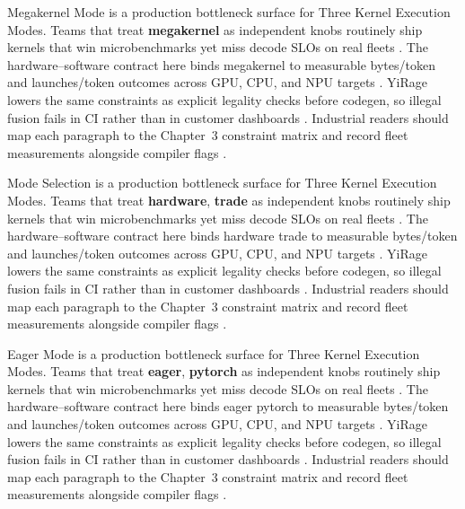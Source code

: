 Megakernel Mode is a production bottleneck surface for Three Kernel Execution Modes. Teams that treat \textbf{megakernel} as independent knobs routinely ship kernels that win microbenchmarks yet miss decode SLOs on real fleets \citep{amd2024aie,kwon2023vllm}. The hardware--software contract here binds megakernel to measurable bytes/token and launches/token outcomes across GPU, CPU, and NPU targets \citep{dlbook,nvidia2024cudagraphs}. YiRage lowers the same constraints as explicit legality checks before codegen, so illegal fusion fails in CI rather than in customer dashboards \citep{dao2022flashattention,liu2024deepseekv3}. Industrial readers should map each paragraph to the Chapter~3 constraint matrix and record fleet measurements alongside compiler flags \citep{kwon2023vllm,patel2025llminference}.

Mode Selection is a production bottleneck surface for Three Kernel Execution Modes. Teams that treat \textbf{hardware}, \textbf{trade} as independent knobs routinely ship kernels that win microbenchmarks yet miss decode SLOs on real fleets \citep{dlbook,nvidia2024cudagraphs}. The hardware--software contract here binds hardware trade to measurable bytes/token and launches/token outcomes across GPU, CPU, and NPU targets \citep{dao2022flashattention,liu2024deepseekv3}. YiRage lowers the same constraints as explicit legality checks before codegen, so illegal fusion fails in CI rather than in customer dashboards \citep{kwon2023vllm,patel2025llminference}. Industrial readers should map each paragraph to the Chapter~3 constraint matrix and record fleet measurements alongside compiler flags \citep{nvidia2024cudagraphs,taxbreak2026}.

Eager Mode is a production bottleneck surface for Three Kernel Execution Modes. Teams that treat \textbf{eager}, \textbf{pytorch} as independent knobs routinely ship kernels that win microbenchmarks yet miss decode SLOs on real fleets \citep{dao2022flashattention,liu2024deepseekv3}. The hardware--software contract here binds eager pytorch to measurable bytes/token and launches/token outcomes across GPU, CPU, and NPU targets \citep{kwon2023vllm,patel2025llminference}. YiRage lowers the same constraints as explicit legality checks before codegen, so illegal fusion fails in CI rather than in customer dashboards \citep{nvidia2024cudagraphs,taxbreak2026}. Industrial readers should map each paragraph to the Chapter~3 constraint matrix and record fleet measurements alongside compiler flags \citep{liu2024deepseekv3,memoryfloor2026}.

